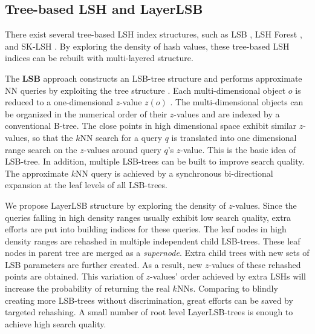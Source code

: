 \subsection{Tree-based LSH and LayerLSB}

There exist several tree-based LSH index structures, such as LSB \cite{lsb}, LSH Forest \cite{Bawa:2005:LFS:1060745.1060840}, and SK-LSH \cite{sklsh}. By exploring the density of hash values, these tree-based LSH indices can be rebuilt with multi-layered structure.


The \textbf{LSB} approach constructs an LSB-tree structure and performs approximate NN queries by exploiting the tree structure \cite{lsb}. Each multi-dimensional object $o$ is reduced to a one-dimensional $z$-value $z(o)$ \cite{Gaede:1998:MAM:280277.280279}. The multi-dimensional objects can be organized in the numerical order of their $z$-values and are indexed by a conventional B-tree. The close points in high dimensional space exhibit similar $z$-values, so that the $k$NN search for a query $q$ is translated into one dimensional range search on the $z$-values around query $q$'s $z$-value. This is the basic idea of LSB-tree. In addition, multiple LSB-trees can be built to improve search quality. The approximate $k$NN query is achieved by a synchronous bi-directional expansion at the leaf levels of all LSB-trees.

We propose LayerLSB structure by exploring the density of $z$-values. Since the queries falling in high density ranges usually exhibit low search quality, extra efforts are put into building indices for these queries. The leaf nodes in high density ranges are rehashed in multiple independent child LSB-trees. These leaf nodes in parent tree are merged as a \emph{supernode}. Extra child trees with new sets of LSB parameters are further created. As a result, new $z$-values of these rehashed points are obtained. This variation of $z$-values' order achieved by extra LSHs will increase the probability of returning the real $k$NNs. Comparing to blindly creating more LSB-trees without discrimination, great efforts can be saved by targeted rehashing. A small number of root level LayerLSB-trees is enough to achieve high search quality.
